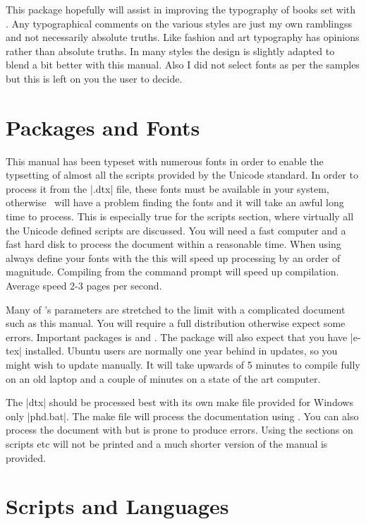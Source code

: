 This package hopefully will assist in improving the typography of books set with \latexe. Any typographical comments on the various styles are just my own ramblingss and not necessarily absolute truths. Like fashion and art typography has opinions rather than absolute truths. In many styles the design is slightly adapted to blend a bit better with this manual. Also I did not select fonts as per the samples but this is left on you the user to decide.



\section{Packages and Fonts}

This manual has been typeset with numerous fonts in order to enable the typsetting of almost all the scripts provided by the Unicode standard. In order to process it from the |.dtx| file, these fonts must be available in your system, otherwise \XeLaTeX\ will have a problem finding the fonts and it will take an awful long time to process. This is especially true for the scripts section, where virtually all the Unicode defined scripts are discussed. You will need a fast computer and a fast hard disk to process the document within a reasonable time. When using  always define your fonts with the \cmd{\newfontfamily} this will speed up processing by an order of magnitude. Compiling from the command prompt will speed up compilation. Average speed 2-3 pages per second.

Many of \tex's parameters are stretched to the limit with a complicated document such as this manual. You will require a full distribution otherwise expect some errors. Important packages is  and . The package will also expect that you have |e-tex| installed. Ubuntu users are normally one year behind in updates, so you might wish to update manually. It will take upwards of 5 minutes to compile fully on an old laptop and a couple of minutes on a state of the art computer.

The |dtx| should be processed best with its own make file provided for Windows only |phd.bat|. The make file will process the documentation using \lualatex. You can also process the document with \xelatex but is prone to produce errors. Using \latexe the sections on scripts etc will not be printed and a much shorter version of the manual is provided. 

\section{Scripts and Languages}

